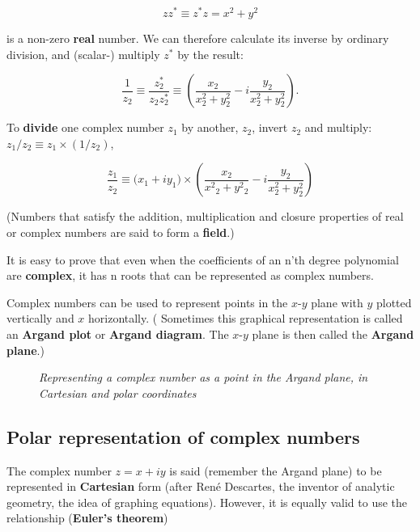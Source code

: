 \begin{equation*}
  zz^* \equiv z^*z = x^2 + y^2
\end{equation*}

is a non-zero \textbf{real} number. We can therefore calculate its inverse by ordinary division, and (scalar-) multiply $z^*$ by the result:

\begin{equation}
  \frac{1}{z_2} \equiv \frac{z_2^*}{z_2z_2^*} \equiv \left(\frac{x_2}{x_2^2 + y_2^2} - i \frac{y_2}{x_2^2 + y_2^2}\right).
\end{equation}

To \textbf{divide} one complex number $z_1$ by another, $z_2$, invert $z_2$ and multiply: $z_1/z_2 \equiv z_1 \times (1/z_2)$, \ie

\begin{equation}
  \frac{z_1}{z_2} \equiv \big(x_1 + iy_1\big) \times \left(\frac{x_2}{x{^2}{_2} + y{^2}{_2}} - i \frac{y_2}{x_2^2 + y_2^2}\right)
\end{equation}

(Numbers that satisfy the addition, multiplication and closure properties of real or complex numbers are said to form a \textbf{field}.)

It is easy to prove that even when the coefficients of an n'th degree polynomial are \textbf{complex}, it has n roots that can be represented as complex numbers.

Complex numbers can be used to represent points in the $x$-$y$ plane with $y$ plotted vertically and $x$ horizontally. ( Sometimes this graphical representation is called an \textbf{Argand plot} or \textbf{Argand diagram}. The $x$-$y$ plane is then called the \textbf{Argand plane}.)

\begin{figure}
    \center
    \caption{\textit{Representing a complex number as a point in the Argand plane, in Cartesian and polar coordinates}}
    \label{fig:07_01}
\end{figure}

\subsection{Polar representation of complex numbers}

The complex number $z = x + iy$ is said (remember the Argand plane) to be represented in \textbf{Cartesian} form (after Ren\'e Descartes, the inventor of analytic geometry, \ie the idea of graphing equations). However, it is equally valid to use the relationship (\textbf{Euler’s theorem})

